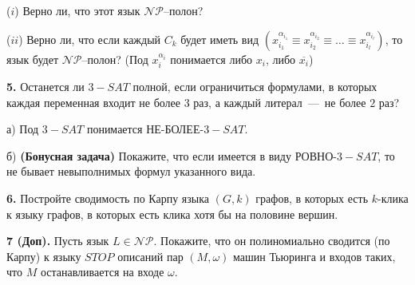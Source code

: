 \documentclass[12pt,a5paper,fleqn]{article}
\begin{document}
($i$) Верно ли, что этот язык $\mathcal{NP}$--полон?

($ii$) Верно ли, что если каждый $C_k$ будет иметь вид $(x_{i_1}^{\alpha_{i_1}} \equiv x_{i_2}^{\alpha_{i_2}} \equiv \dotsc \equiv x_{i_l}^{\alpha_{i_l}})$, то язык будет $\mathcal{NP}$--полон? (Под $x_i^{\alpha_i}$ понимается либо $x_i$, либо $\overline{x_i}$)

{\bf 5.} Останется ли $3-SAT$ полной, если ограничиться формулами, в которых каждая переменная входит не более $3$ раз, а каждый литерал~---~не более $2$ раз?

а) Под $3-SAT$ понимается НЕ-БОЛЕЕ-$3-SAT$.

б) {\bf (Бонусная задача)} Покажите, что если имеется в виду РОВНО-$3-SAT$, то не бывает невыполнимых формул указанного вида.

\smallskip

{\bf 6.} Постройте сводимость по Карпу языка $(G, k)$ графов, в которых есть $k$-клика к языку графов, в которых есть клика хотя бы на половине вершин.

\smallskip

{\bf 7 (Доп).} Пусть язык $L\in\mathcal{NP}$. Покажите, что он полиномиально сводится (по Карпу) к языку $STOP$ описаний пар $(M, \omega)$ машин Тьюринга и входов таких, что $M$ останавливается на входе $\omega$.
\end{document}

